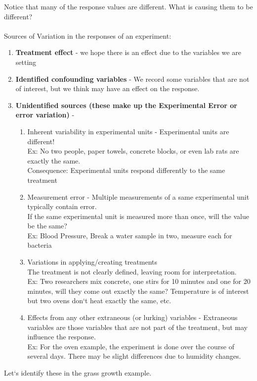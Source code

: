 Notice that many of the response values are different.  What is causing them to be different?\\~\\
Sources of Variation in the responses of an experiment:
\begin{enumerate}
\item \textbf{Treatment effect} - we hope there is an effect due to the variables we are setting
\item \textbf{Identified confounding variables} - We record some variables that are not of interest, but we think may have an effect on the response.
\item \textbf{Unidentified sources (these make up the Experimental Error or error variation)} -
		\begin{enumerate}
			\item Inherent variability in experimental units - Experimental units are different! \\
		Ex: No two people, paper towels, concrete blocks, or even lab rats are exactly the same.\\
		Consequence: Experimental units respond differently to the same treatment
			\item Measurement error - Multiple measurements of a same experimental unit typically contain error.\\
			If the same experimental unit is measured more than once, will the value be the same?\\
			Ex: Blood Pressure, Break a water sample in two, measure each for bacteria
			\item Variations in applying/creating treatments\\
		The treatment is not clearly defined, leaving room for interpretation.  \\
			Ex:  Two researchers mix concrete, one stirs for 10 minutes and one for 20 minutes, will they come out exactly the same? Temperature is of interest but two ovens don`t heat exactly the same, etc.
			\item Effects from any other extraneous (or lurking) variables - Extraneous variables are those variables that are not part of the treatment, but may influence the response.\\
			Ex: For the oven example, the experiment is done over the course of several days.  There may be slight differences due to humidity changes.
		\end{enumerate}
\end{enumerate}
Let`s identify these in the grass growth example.
